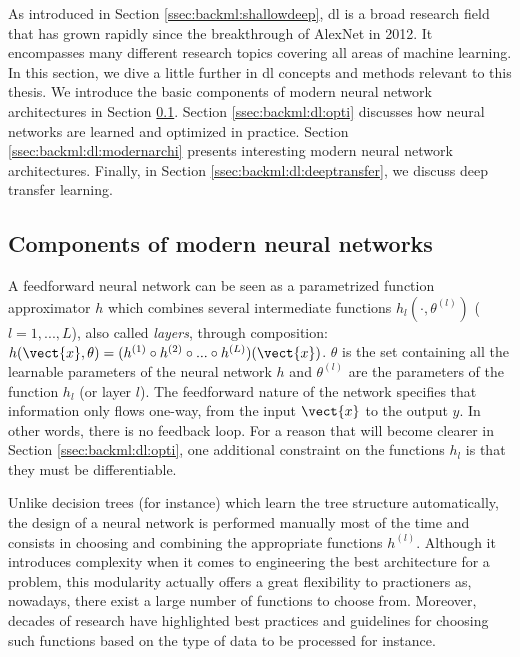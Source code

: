 As introduced in Section \ref{ssec:backml:shallowdeep}, \acrlong{dl} is a broad research field that has grown rapidly since the breakthrough of AlexNet in 2012. It encompasses many different research topics covering all areas of machine learning. In this section, we dive a little further in \acrlong{dl} concepts and methods relevant to this thesis. We introduce the basic components of modern neural network architectures in Section \ref{ssec:backml:dp:components}. Section \ref{ssec:backml:dl:opti} discusses how neural networks are learned and optimized in practice. Section \ref{ssec:backml:dl:modernarchi} presents interesting modern neural network architectures. Finally, in Section \ref{ssec:backml:dl:deeptransfer}, we discuss deep transfer learning.   

\subsection{Components of modern neural networks}
\label{ssec:backml:dp:components}

A feedforward neural network can be seen as a parametrized function approximator $h$ which combines several intermediate functions $h_l(\cdot, \theta^{(l)})$ ($l=1, ..., L$), also called \textit{layers}, through composition: $h(\vect{x}, \theta) = (h^{(1)} \circ h^{(2)} \circ ... \circ h^{(L)})(\vect{x})$. $\theta$ is the set containing all the learnable parameters of the neural network $h$ and $\theta^{(l)}$ are the parameters of the function $h_l$ (or layer $l$). The feedforward nature of the network specifies that information only flows one-way, from the input $\vect{x}$ to the output $y$. In other words, there is no feedback loop. For a reason that will become clearer in Section \ref{ssec:backml:dl:opti}, one additional constraint on the functions $h_l$ is that they must be differentiable. 

Unlike decision trees (for instance) which learn the tree structure automatically, the design of a neural network is performed manually most of the time and consists in choosing and combining the appropriate functions $h^{(l)}$. Although it introduces complexity when it comes to engineering the best architecture for a problem, this modularity actually offers a great flexibility to practioners as, nowadays, there exist a large number of functions to choose from. Moreover, decades of research have highlighted best practices and guidelines for choosing such functions based on the type of data to be processed for instance. 

